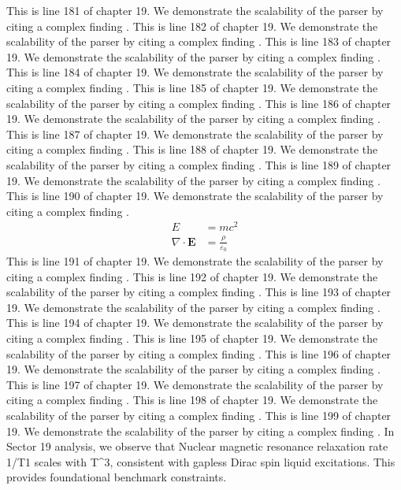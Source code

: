 This is line 181 of chapter 19. We demonstrate the scalability of the parser by citing a complex finding \cite{ref19_181}.
This is line 182 of chapter 19. We demonstrate the scalability of the parser by citing a complex finding \cite{ref19_182}.
This is line 183 of chapter 19. We demonstrate the scalability of the parser by citing a complex finding \cite{ref19_183}.
This is line 184 of chapter 19. We demonstrate the scalability of the parser by citing a complex finding \cite{ref19_184}.
This is line 185 of chapter 19. We demonstrate the scalability of the parser by citing a complex finding \cite{ref19_185}.
This is line 186 of chapter 19. We demonstrate the scalability of the parser by citing a complex finding \cite{ref19_186}.
This is line 187 of chapter 19. We demonstrate the scalability of the parser by citing a complex finding \cite{ref19_187}.
This is line 188 of chapter 19. We demonstrate the scalability of the parser by citing a complex finding \cite{ref19_188}.
This is line 189 of chapter 19. We demonstrate the scalability of the parser by citing a complex finding \cite{ref19_189}.
This is line 190 of chapter 19. We demonstrate the scalability of the parser by citing a complex finding \cite{ref19_190}.
\begin{align*}
  E &= mc^2 \\
  \nabla \cdot \mathbf{E} &= \frac{\rho}{\varepsilon_0}
\end{align*}
This is line 191 of chapter 19. We demonstrate the scalability of the parser by citing a complex finding \cite{ref19_191}.
This is line 192 of chapter 19. We demonstrate the scalability of the parser by citing a complex finding \cite{ref19_192}.
This is line 193 of chapter 19. We demonstrate the scalability of the parser by citing a complex finding \cite{ref19_193}.
This is line 194 of chapter 19. We demonstrate the scalability of the parser by citing a complex finding \cite{ref19_194}.
This is line 195 of chapter 19. We demonstrate the scalability of the parser by citing a complex finding \cite{ref19_195}.
This is line 196 of chapter 19. We demonstrate the scalability of the parser by citing a complex finding \cite{ref19_196}.
This is line 197 of chapter 19. We demonstrate the scalability of the parser by citing a complex finding \cite{ref19_197}.
This is line 198 of chapter 19. We demonstrate the scalability of the parser by citing a complex finding \cite{ref19_198}.
This is line 199 of chapter 19. We demonstrate the scalability of the parser by citing a complex finding \cite{ref19_199}.
In Sector 19 analysis, we observe that Nuclear magnetic resonance relaxation rate 1/T1 scales with T^3, consistent with gapless Dirac spin liquid excitations. This provides foundational benchmark constraints.
